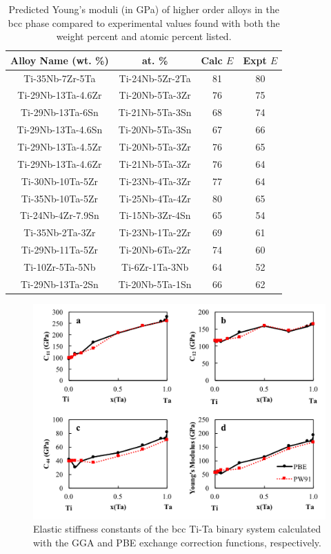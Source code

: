 \newpage
\begin{table}[H]
	\caption{Predicted Young's moduli (in GPa) of higher order alloys in the bcc phase compared to experimental values found with both the weight percent and atomic percent listed.}
	\centering
	\begin{tabular}{ c c c c }
		\hline
		Alloy Name (wt. \%) & at. \% & Calc $E$ & Expt $E$\\
		\hline
		Ti-35Nb-7Zr-5Ta \cite{Geetha2009} & Ti-24Nb-5Zr-2Ta & 81 & 80\\
		Ti-29Nb-13Ta-4.6Zr \cite{Geetha2009}  & Ti-20Nb-5Ta-3Zr & 76 & 75\\
		Ti-29Nb-13Ta-6Sn \cite{Geetha2009} & Ti-21Nb-5Ta-3Sn & 68 & 74\\
		Ti-29Nb-13Ta-4.6Sn \cite{Geetha2009} & Ti-20Nb-5Ta-3Sn & 67 & 66\\
		Ti-29Nb-13Ta-4.5Zr \cite{Geetha2009} & Ti-20Nb-5Ta-3Zr & 76 & 65\\
		Ti-29Nb-13Ta-4.6Zr \cite{Tane2010a} & Ti-21Nb-5Ta-3Zr & 76 & 64\\
		Ti-30Nb-10Ta-5Zr \cite{Tane2010a} & Ti-23Nb-4Ta-3Zr & 77 & 64\\
		Ti-35Nb-10Ta-5Zr \cite{Tane2010a} & Ti-25Nb-4Ta-4Zr & 80 & 65\\
		Ti-24Nb-4Zr-7.9Sn \cite{Mohammed2014} & Ti-15Nb-3Zr-4Sn & 65 & 54\\
		Ti-35Nb-2Ta-3Zr \cite{Mohammed2014} & Ti-23Nb-1Ta-2Zr & 69 & 61\\
		Ti-29Nb-11Ta-5Zr \cite{Mohammed2014} & Ti-20Nb-6Ta-2Zr & 74 & 60\\
		Ti-10Zr-5Ta-5Nb \cite{Mohammed2014} & Ti-6Zr-1Ta-3Nb & 64 & 52\\
		Ti-29Nb-13Ta-2Sn \cite{Mohammed2014} & Ti-20Nb-5Ta-1Sn & 66 & 62\\
		\hline
	\end{tabular}
	\label{Ch5-table:tixdatacomp}
\end{table}
\clearpage

\pagebreak
\begin{figure}[H]
	\centering
	\includegraphics[width=\textwidth]{Chapter-5/Figures/PBEvsPW91.png}
	\caption{Elastic stiffness constants of the bcc Ti-Ta binary system calculated with the GGA and PBE exchange correction functions, respectively.}
	\label{Ch5-figure:PBEvsPW91}
\end{figure}

